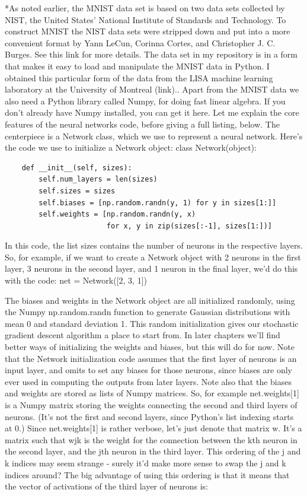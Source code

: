 *As noted earlier, the MNIST data set is based on two data sets collected by NIST, the United States' National Institute of Standards and Technology. To construct MNIST the NIST data sets were stripped down and put into a more convenient format by Yann LeCun, Corinna Cortes, and Christopher J. C. Burges. See this link for more details. The data set in my repository is in a form that makes it easy to load and manipulate the MNIST data in Python. I obtained this particular form of the data from the LISA machine learning laboratory at the University of Montreal (link)..
Apart from the MNIST data we also need a Python library called Numpy, for doing fast linear algebra. If you don't already have Numpy installed, you can get it here.
Let me explain the core features of the neural networks code, before giving a full listing, below. The centerpiece is a Network class, which we use to represent a neural network. Here's the code we use to initialize a Network object:
class Network(object):

\begin{lstlisting}
    def __init__(self, sizes):
        self.num_layers = len(sizes)
        self.sizes = sizes
        self.biases = [np.random.randn(y, 1) for y in sizes[1:]]
        self.weights = [np.random.randn(y, x) 
                        for x, y in zip(sizes[:-1], sizes[1:])]
\end{lstlisting}
                        
In this code, the list sizes contains the number of neurons in the respective layers. So, for example, if we want to create a Network object with 2 neurons in the first layer, 3 neurons in the second layer, and 1 neuron in the final layer, we'd do this with the code: 
net = Network([2, 3, 1])

The biases and weights in the Network object are all initialized randomly, using the Numpy np.random.randn function to generate Gaussian distributions with mean 0 and standard deviation 1. This random initialization gives our stochastic gradient descent algorithm a place to start from. In later chapters we'll find better ways of initializing the weights and biases, but this will do for now. Note that the Network initialization code assumes that the first layer of neurons is an input layer, and omits to set any biases for those neurons, since biases are only ever used in computing the outputs from later layers.
Note also that the biases and weights are stored as lists of Numpy matrices. So, for example net.weights[1] is a Numpy matrix storing the weights connecting the second and third layers of neurons. (It's not the first and second layers, since Python's list indexing starts at 0.) Since net.weights[1] is rather verbose, let's just denote that matrix w. It's a matrix such that wjk is the weight for the connection between the kth neuron in the second layer, and the jth neuron in the third layer. This ordering of the j and k indices may seem strange - surely it'd make more sense to swap the j and k indices around? The big advantage of using this ordering is that it means that the vector of activations of the third layer of neurons is: 

